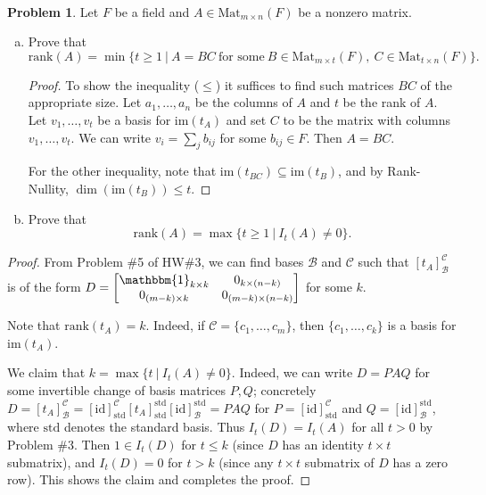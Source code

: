 \documentclass[11pt]{article}
\theoremstyle{definition}
\newtheorem{problem}{Problem}
\begin{document}
\

\begin{problem} Let $F$ be a field and $A\in \mathrm{Mat}_{m\times n}(F)$ be a nonzero matrix. 
\begin{enumerate}[(a)]
\item Prove that
\[ \mathrm{rank}(A)=\min\{ t\geq 1 \ | \ A=BC \ \text{for some} \ B\in \mathrm{Mat}_{m\times t}(F), \ C\in \mathrm{Mat}_{t\times n}(F)\}.\]
\begin{proof}
To show the inequality ($\leq$) it suffices to find such matrices $BC$ of the appropriate size. Let $a_1,\dots,a_n$ be the columns of $A$ and $t$ be the rank of $A$. Let $v_1,\dots,v_t$ be a basis for $\mathrm{im}(t_A)$ and set $C$ to be the matrix with columns $v_1,\dots,v_t$. We can write $v_i = \sum_{j} b_{ij}$ for some $b_{ij}\in F$. Then $A=BC$.

For the other inequality, note that $\mathrm{im}(t_{BC}) \subseteq \mathrm{im}(t_B)$, and by Rank-Nullity, ${\dim( \mathrm{im}(t_B))\leq t}$. 
\end{proof}
\item Prove that
\[ \mathrm{rank}(A)=\max\{ t\geq 1 \ | \  I_t(A) \neq 0\}.\]
\end{enumerate}
\begin{proof} From Problem \#5 of HW\#3, we can find bases $\mathcal{B}$ and $\mathcal{C}$ such that $[t_A]_{\mathcal{B}}^{\mathcal{C}}$ is of the form $D=\begin{bmatrix} \mathbbm{1}_{k\times k} & {0}_{k\times (n-k)} \\ {0}_{(m-k)\times k} & {0}_{(m-k)\times(n-k)}\end{bmatrix}$ for some $k$. 

Note that $\mathrm{rank}(t_A) = k$. Indeed, if $\mathcal{C}=\{c_1,\dots,c_m\}$, then $\{c_1,\dots,c_k\}$ is a basis for $\mathrm{im}(t_A)$.

We claim that $k=\max\{ t \ | \ I_t(A)\neq 0\}$. Indeed, we can write $D=PAQ$ for some invertible change of basis matrices $P,Q$; concretely $ D= [t_A]_{\mathcal{B}}^{\mathcal{C}} =[\mathrm{id}]_{\mathrm{std}}^{\mathcal{C}} [t_A]_{\mathrm{std}}^{\mathrm{std}} [\mathrm{id}]_{\mathcal{B}}^{\mathrm{std}} = P A Q$ for $P=[\mathrm{id}]_{\mathrm{std}}^{\mathcal{C}} $ and $Q=[\mathrm{id}]_{\mathcal{B}}^{\mathrm{std}}$, where $\mathrm{std}$ denotes the standard basis. Thus $I_t(D) = I_t(A)$ for all $t>0$ by Problem \#3. Then $1\in I_t(D)$ for $t\leq k$ (since $D$ has an identity $t\times t$ submatrix), and $I_t(D)=0$ for $t>k$  (since any $t\times t$ submatrix of $D$ has a zero row). This shows the claim and completes the proof.
\end{proof}
\end{problem}
\end{document}
